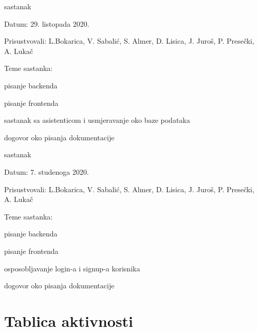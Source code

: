 \begin{packed_enum}
			\item  sastanak
			\item[] \begin{packed_item}
				\item Datum: 29. listopada 2020.
				\item Prisustvovali: L.Bokarica, V. Sabalić, S. Almer, D. Lisica, J. Juroš, P. Presečki, A. Lukač
				\item Teme sastanka:
				\begin{packed_item}
					\item  pisanje backenda
					\item pisanje frontenda
					\item  sastanak sa asistenticom i usmjeravanje oko baze podataka
					\item dogovor oko pisanja dokumentacije
				\end{packed_item}
			\end{packed_item}
		
				\item  sastanak
			\item[] \begin{packed_item}
				\item Datum: 7. studenoga 2020.
				\item Prisustvovali: L.Bokarica, V. Sabalić, S. Almer, D. Lisica, J. Juroš, P. Presečki, A. Lukač
				\item Teme sastanka:
				\begin{packed_item}
					\item  pisanje backenda
					\item pisanje frontenda
					\item osposobljavanje login-a i signup-a korisnika
					\item  dogovor oko pisanja dokumentacije
				\end{packed_item}
			\end{packed_item}
			
			
		\end{packed_enum}
		
		\eject
		\section*{Tablica aktivnosti}					
			

